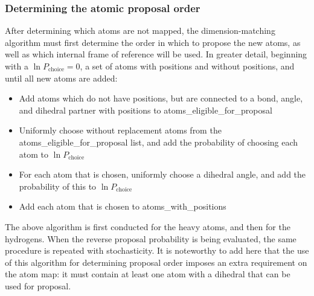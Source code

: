\subsubsection{Determining the atomic proposal order}
%
After determining which atoms are not mapped, the dimension-matching algorithm must first determine the order in which to propose the new atoms, as well as which internal frame of reference will be used.
%
In greater detail, beginning with a $\ln P_\mathrm{choice} = 0$, a set of atoms with positions and without positions, and until all new atoms are added:
\begin{itemize}
    \item Add atoms which do not have positions, but are connected to a bond, angle, and dihedral partner with positions to atoms\_eligible\_for\_proposal
    \item Uniformly choose without replacement atoms from the atoms\_eligible\_for\_proposal list, and add the probability of choosing each atom to $\ln P_\mathrm{choice}$
    \item For each atom that is chosen, uniformly choose a dihedral angle, and add the probability of this to $\ln P_\mathrm{choice}$
    \item Add each atom that is chosen to atoms\_with\_positions
\end{itemize}
%
The above algorithm is first conducted for the heavy atoms, and then for the hydrogens.
%
When the reverse proposal probability is being evaluated, the same procedure is repeated with stochasticity.
%
It is noteworthy to add here that the use of this algorithm for determining proposal order imposes an extra requirement on the atom map: it must contain at least one atom with a dihedral that can be used for proposal.
%
%
